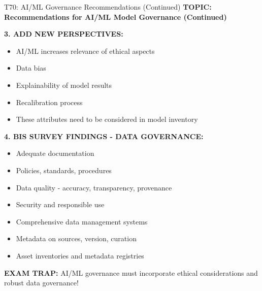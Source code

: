 \documentclass[8pt]{beamer}
\begin{document}
	\begin{frame}{T70: AI/ML Governance Recommendations (Continued)}
		\fontsize{6.5}{7.5}\selectfont
		\textbf{TOPIC: Recommendations for AI/ML Model Governance (Continued)}
		
		\vspace{0.1cm}
		\textbf{3. ADD NEW PERSPECTIVES:}
		\begin{itemize}
			\item AI/ML increases relevance of ethical aspects
			\item Data bias
			\item Explainability of model results
			\item Recalibration process
			\item These attributes need to be considered in model inventory
		\end{itemize}
		
		\vspace{0.1cm}
		\textbf{4. BIS SURVEY FINDINGS - DATA GOVERNANCE:}
		\begin{itemize}
			\item Adequate documentation
			\item Policies, standards, procedures
			\item Data quality - accuracy, transparency, provenance
			\item Security and responsible use
			\item Comprehensive data management systems
			\item Metadata on sources, version, curation
			\item Asset inventories and metadata registries
		\end{itemize}
		
		\textcolor{myred}{\textbf{EXAM TRAP:}} AI/ML governance must \textcolor{myblue}{incorporate ethical considerations and robust data governance}!
	\end{frame}
	
\end{document}
